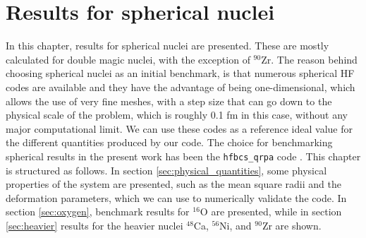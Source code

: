 \chapter{Results for spherical nuclei}
\label{chap:res_sph}
In this chapter, results for spherical nuclei are presented. These are mostly calculated for double magic nuclei, with the exception of $^{90}$Zr.
The reason behind choosing spherical nuclei as an initial benchmark, is that numerous spherical HF codes are available and they have the advantage of being one-dimensional, which allows the use of very fine meshes, with a step size that can go down to the physical scale of the problem, which is roughly 0.1 fm in this case, without any major computational limit. We can use these codes as a reference ideal value for the different quantities produced by our code. The choice for benchmarking spherical results in the present work has been the \texttt{hfbcs\_qrpa} code \cite{hfbcsqrpa}.
This chapter is structured as follows. In section \ref{sec:physical_quantities}, some physical properties of the system are presented, such as the mean square radii and the deformation parameters, which we can use to numerically validate the code. In section \ref{sec:oxygen}, benchmark results for $^{16}$O are presented, while in section \ref{sec:heavier} results for the heavier nuclei $^{48}$Ca, $^{56}$Ni, and $^{90}$Zr are shown.

